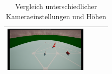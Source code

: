 \begin{table}[h!]
\begin{tabular}{|c|c|c|c|}
        \includegraphics[width=4cm]{img/unrealengine/h75_f120_w45.png} \\
        \hline
    \end{tabular}
    \caption{Vergleich unterschiedlicher Kameraeinstellungen und Höhen}
\end{table}


